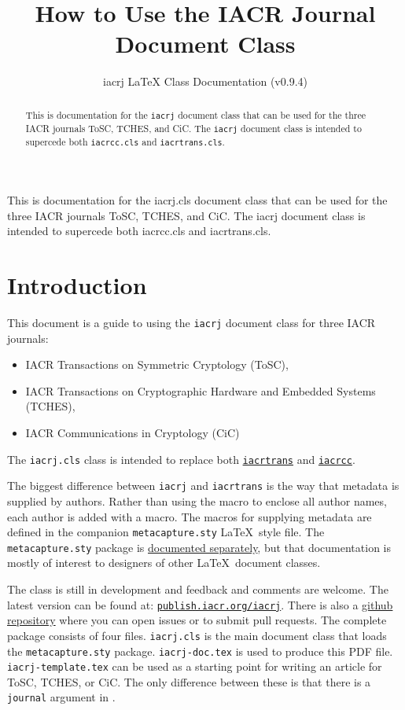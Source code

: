 \documentclass[journal=cic,version=preprint]{iacrj}
\title[running  = {The iacrj document class}]{How to Use the IACR Journal Document Class}
\subtitle{iacrj LaTeX Class Documentation (v0.9.4)}
\begin{document}
\maketitle


\begin{abstract}
  This is documentation for the \texttt{iacrj} document class that can
  be used for the three IACR journals ToSC, TCHES, and
  CiC. The \texttt{iacrj} document class is intended to supercede
  both \texttt{iacrcc.cls} and \texttt{iacrtrans.cls}.
\end{abstract}
\begin{textabstract}
  This is documentation for the iacrj.cls document class that can
  be used for the three IACR journals ToSC, TCHES, and
  CiC. The iacrj document class is intended to supercede
  both iacrcc.cls and iacrtrans.cls.
\end{textabstract}
\section*{Introduction}

This document is a guide to using the \texttt{iacrj} document class for
three IACR journals:
\begin{itemize}
\item IACR Transactions on Symmetric Cryptology (ToSC),
\item IACR Transactions on Cryptographic Hardware and Embedded Systems (TCHES),
\item IACR Communications in Cryptology (CiC)
\end{itemize}
The \texttt{iacrj.cls} class is intended to replace both
\href{https://github.com/Cryptosaurus/iacrtrans}{\texttt{iacrtrans}}
and \href{https://github.com/IACR/latex/iacrcc}{\texttt{iacrcc}}.

The biggest difference between \texttt{iacrj} and
\texttt{iacrtrans} is the way that metadata is supplied by authors.
Rather than using the  macro to enclose all author names,
each author is added with a  macro. The macros for
supplying metadata are defined in the
companion \texttt{metacapture.sty}
\LaTeX\ style file. The \texttt{metacapture.sty} package is \href{metacapture-doc.pdf}{documented separately},
but that documentation is mostly of interest to designers of
other \LaTeX\ document classes.

The class is still in development and feedback and comments are
welcome.  The latest version can be found at:
\href{https://publish.iacr.org/iacrj}{\texttt{publish.iacr.org/iacrj}}.
There is also a \href{https://github.com/IACR/latex}{github
repository} where you can open issues or to submit pull requests.
The complete package consists of four files. \texttt{iacrj.cls} is
the main document class that loads the \texttt{metacapture.sty}
package. \texttt{iacrj-doc.tex} is used to produce this PDF
file. \texttt{iacrj-template.tex} can be used as a starting point for
writing an article for ToSC, TCHES, or CiC. The only difference
between these is that there is a \texttt{journal} argument
in .
\end{document}
